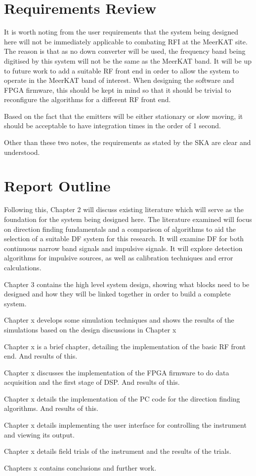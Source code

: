 \section{Requirements Review}
It is worth noting from the user requirements that the system being designed here will not be immediately applicable to combating RFI at the MeerKAT site. The reason is that as no down converter will be used, the frequency band being digitised by this system will not be the same as the MeerKAT band. It will be up to future work to add a suitable RF front end in order to allow the system to operate in the MeerKAT band of interest. When designing the software and FPGA firmware, this should be kept in mind so that it should be trivial to reconfigure the algorithms for a different RF front end. 

Based on the fact that the emitters will be either stationary or slow moving, it should be acceptable to have integration times in the order of 1 second. 

Other than these two notes, the requirements as stated by the SKA are clear and understood.

\section{Report Outline}
Following this, Chapter 2 will discuss existing literature which will serve as the foundation for the system being designed here. The literature examined will focus on direction finding fundamentals and a comparison of algorithms to aid the selection of a suitable DF system for this research. It will examine DF for both continuous narrow band signals and impulsive signals. It will explore detection algorithms for impulsive sources, as well as calibration techniques and error calculations.

Chapter 3 contains the high level system design, showing what blocks need to be designed and how they will be linked together in order to build a complete system.

Chapter x develops some simulation techniques and shows the results of the simulations based on the design discussions in Chapter x

Chapter x is a brief chapter, detailing the implementation of the basic RF front end. And results of this.

Chapter x discusses the implementation of the FPGA firmware to do data acquisition and the first stage of DSP. And results of this.

Chapter x details the implementation of the PC code for the direction finding algorithms. And results of this.

Chapter x details implementing the user interface for controlling the instrument and viewing its output.

Chapter x details field trials of the instrument and the results of the trials.

Chapters x contains conclusions and further work. 

